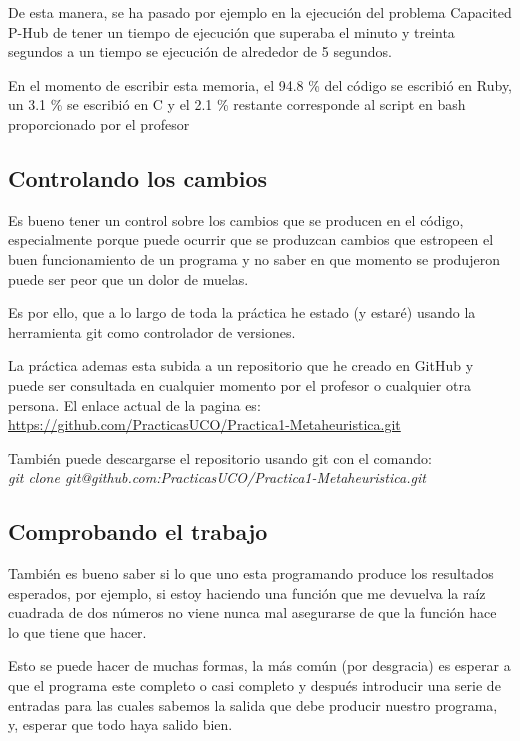 \documentclass[12pt,a4paper,draft,openany]{article}
\begin{document}
De esta manera, se ha pasado por ejemplo en la ejecución del problema Capacited P-Hub de tener un tiempo de ejecución que superaba el minuto y treinta segundos a un tiempo se ejecución de alrededor de 5 segundos.

En el momento de escribir esta memoria, el 94.8 \% del código se escribió en Ruby, un 3.1 \% se escribió en C y el 2.1 \% restante corresponde al script en bash proporcionado por el profesor

\subsection{Controlando los cambios}
Es bueno tener un control sobre los cambios que se producen en el código, especialmente porque puede ocurrir que se produzcan cambios que estropeen el buen funcionamiento de un programa y no saber en que momento se produjeron puede ser peor que un dolor de muelas.

Es por ello, que a lo largo de toda la práctica he estado (y estaré) usando la herramienta
git como controlador de versiones.

La práctica ademas esta subida a un repositorio que he creado en GitHub y puede ser consultada en cualquier momento por el profesor o cualquier otra persona. El enlace actual de la pagina es: \url{https://github.com/PracticasUCO/Practica1-Metaheuristica.git}

También puede descargarse el repositorio usando git con el comando: \\
\emph{git clone git@github.com:PracticasUCO/Practica1-Metaheuristica.git}

\subsection{Comprobando el trabajo}
También es bueno saber si lo que uno esta programando produce los resultados esperados, por ejemplo, si estoy haciendo una función que me devuelva la raíz cuadrada de dos números no viene nunca mal asegurarse de que la función hace lo que tiene que hacer.

Esto se puede hacer de muchas formas, la más común (por desgracia) es esperar a que el programa este completo o casi completo y después introducir una serie de entradas para las cuales sabemos la salida que debe producir nuestro programa, y, esperar que todo haya salido bien.
\end{document}
